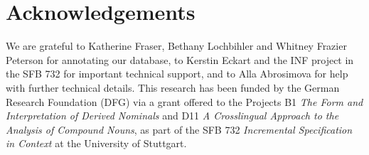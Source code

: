 \documentclass[output=paper]{langsci/langscibook}
\begin{document}
\section*{Acknowledgements}
We are grateful to Katherine Fraser, Bethany Lochbihler and Whitney Frazier Peterson for annotating our database, to Kerstin Eckart and the INF project in the SFB 732 for important technical support, and to Alla Abrosimova for help with further technical details. This research has been funded by the German Research Foundation (DFG) via a grant offered to the Projects B1 \textit{The Form and Interpretation of Derived Nominals} and D11 \textit{A Crosslingual Approach to the Analysis of Compound Nouns}, as part of the SFB 732 \textit{Incremental Specification in Context} at the University of Stuttgart.

{\sloppy\printbibliography[heading=subbibliography,notkeyword=this]}
\end{document}
